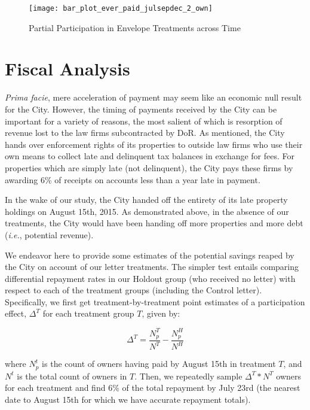 \documentclass[12pt,titlepage]{article}
\begin{document}
\begin{figure}[htpb]
\begin{center}
\caption{Partial Participation in Envelope Treatments across Time}
\label{fig:ep_time_2_own}
\bigskip
\texttt{[image: bar\_plot\_ever\_paid\_julsepdec\_2\_own]}
\end{center}
\end{figure}






\section{Fiscal Analysis}

\textit{Prima facie}, mere acceleration of payment may seem like an
economic null result for the City. However, the timing of payments received
by the City can be important for a variety of reasons, the most salient of
which is resorption of revenue lost to the law firms subcontracted by DoR.
As mentioned, the City hands over enforcement rights of its properties to
outside law firms who use their own means to collect late and delinquent
tax balances in exchange for fees. For properties which are simply late
(not delinquent), the City pays these firms by awarding 6\% of receipts on
accounts less than a year late in payment.

In the wake of our study, the City handed off the entirety of its late 
property holdings on August 15th, 2015. As demonstrated above, in the
absence of our treatments, the City would have been handing off more
properties and more debt (\textit{i.e.}, potential revenue).

We endeavor here to provide some estimates of the potential savings
reaped by the City on account of our letter treatments. The simpler test
entails comparing differential repayment rates in our Holdout group
(who received no letter) with respect to each of the treatment groups 
(including the Control letter). Specifically, we first get 
treatment-by-treatment point estimates of a participation effect,
$\Delta^T$ for each treatment group $T$, given by:

\[
\Delta^T = \frac{N^T_p}{N^T} - \frac{N^H_p}{N^H}
\]

where $N^t_p$ is the count of owners having paid by August 15th in
treatment $T$, and $N^t$ is the total count of owners in $T$. Then,
we repeatedly sample $\Delta^T * N^T$ owners for each treatment and find
6\% of the total repayment by July 23rd (the nearest date to August
15th for which we have accurate repayment totals).
\end{document}
